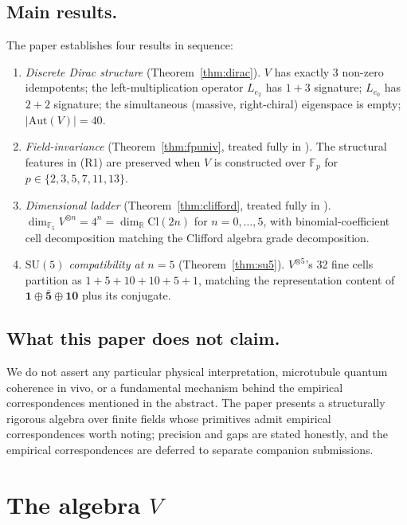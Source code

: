 \documentclass[11pt,reqno]{amsart}
\theoremstyle{plain}
\theoremstyle{definition}
\theoremstyle{remark}
\newcommand{\F}{\mathbb{F}}
\newcommand{\R}{\mathbb{R}}
\newcommand{\Cl}{\mathrm{Cl}}
\newcommand{\Aut}{\mathrm{Aut}}
\begin{document}
\subsection{Main results.} The paper establishes four results in
sequence:
\begin{enumerate}[label={(R\arabic*)}]
\item \emph{Discrete Dirac structure} (Theorem~\ref{thm:dirac}). $V$ has
exactly 3 non-zero idempotents; the left-multiplication operator
$L_{e_2}$ has $1{+}3$ signature; $L_{e_0}$ has $2{+}2$ signature; the
simultaneous (massive, right-chiral) eigenspace is empty;
$|\Aut(V)| = 40$.

\item \emph{Field-invariance} (Theorem~\ref{thm:fpuniv}, treated
fully in \cite{SandersGishFpUniversality}). The structural features in
(R1) are preserved when $V$ is constructed over $\F_p$ for
$p \in \{2,3,5,7,11,13\}$.

\item \emph{Dimensional ladder} (Theorem~\ref{thm:clifford}, treated
fully in \cite{SandersGishCliffordLadder}).
$\dim_{\F_5}V^{\otimes n} = 4^n = \dim_\R \Cl(2n)$ for
$n = 0, \ldots, 5$, with binomial-coefficient cell decomposition
matching the Clifford algebra grade decomposition.

\item \emph{$\mathrm{SU}(5)$ compatibility at $n=5$}
(Theorem~\ref{thm:su5}). $V^{\otimes 5}$'s 32 fine cells partition as
$1+5+10+10+5+1$, matching the representation content of
$\mathbf{1} \oplus \bar{\mathbf{5}} \oplus \mathbf{10}$ plus its
conjugate.
\end{enumerate}

\subsection{What this paper does not claim.} We do not assert any
particular physical interpretation, microtubule quantum coherence in
vivo, or a fundamental mechanism behind the empirical correspondences
mentioned in the abstract. The paper presents a structurally rigorous
algebra over finite fields whose primitives admit empirical
correspondences worth noting; precision and gaps are stated honestly,
and the empirical correspondences are deferred to separate companion
submissions.

\section{The algebra $V$}
\label{sec:V}
\end{document}
